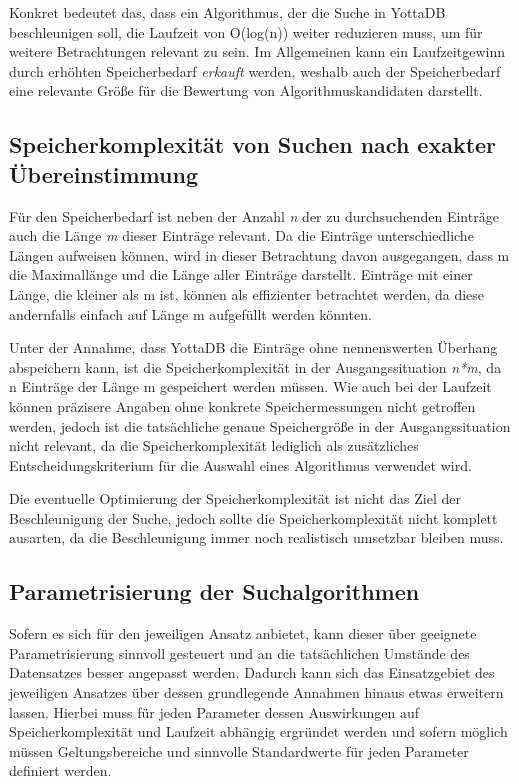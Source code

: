 \documentclass[oneside]{ausarbeitung}
\begin{document}
	Konkret bedeutet das, dass ein Algorithmus, der die Suche in YottaDB beschleunigen soll, die Laufzeit von O(log(n)) weiter reduzieren muss, um für weitere Betrachtungen relevant zu sein. Im Allgemeinen kann ein Laufzeitgewinn durch erhöhten Speicherbedarf \textit{erkauft} werden, weshalb auch der Speicherbedarf eine relevante Größe für die Bewertung von Algorithmuskandidaten darstellt.
	
	
	
	\subsection{Speicherkomplexität von Suchen nach exakter Übereinstimmung}
	
	Für den Speicherbedarf ist neben der Anzahl \textit{n} der zu durchsuchenden Einträge auch die Länge \textit{m} dieser Einträge relevant. Da die Einträge unterschiedliche Längen aufweisen können, wird in dieser Betrachtung davon ausgegangen, dass m die Maximallänge und die Länge aller Einträge darstellt. Einträge mit einer Länge, die kleiner als m ist, können als effizienter betrachtet werden, da diese andernfalls einfach auf Länge m aufgefüllt werden könnten.
	
	Unter der Annahme, dass YottaDB die Einträge ohne nennenswerten Überhang abspeichern kann, ist die Speicherkomplexität in der Ausgangssituation \textit{n*m}, da n Einträge der Länge m gespeichert werden müssen. Wie auch bei der Laufzeit können präzisere Angaben ohne konkrete Speichermessungen nicht getroffen werden, jedoch ist die tatsächliche genaue Speichergröße in der Ausgangssituation nicht relevant, da die Speicherkomplexität lediglich als zusätzliches Entscheidungskriterium für die Auswahl eines Algorithmus verwendet wird.
	
	Die eventuelle Optimierung der Speicherkomplexität ist nicht das Ziel der Beschleunigung der Suche, jedoch sollte die Speicherkomplexität nicht komplett ausarten, da die Beschleunigung immer noch realistisch umsetzbar bleiben muss.
	
	
	
	\subsection{Parametrisierung der Suchalgorithmen}
	
	Sofern es sich für den jeweiligen Ansatz anbietet, kann dieser über geeignete Parametrisierung sinnvoll gesteuert und an die tatsächlichen Umstände des Datensatzes besser angepasst werden. Dadurch kann sich das Einsatzgebiet des jeweiligen Ansatzes über dessen grundlegende Annahmen hinaus etwas erweitern lassen. Hierbei muss für jeden Parameter dessen Auswirkungen auf Speicherkomplexität und Laufzeit abhängig ergründet werden und sofern möglich müssen Geltungsbereiche und sinnvolle Standardwerte für jeden Parameter definiert werden.
	
\end{document}
